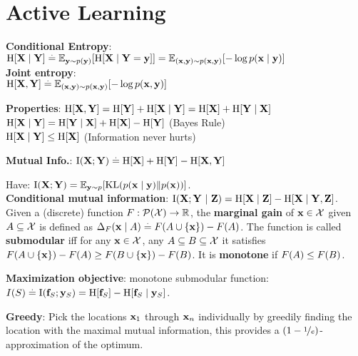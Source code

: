 \section{Active Learning}
\begin{framed}
    \textbf{Conditional Entropy}: \\
    $\H{\rX \mid \rY} \defeq \E[\vy \sim p(\vy)]{\H{\rX \mid \rY = \vy}} \\= \E[(\vx, \vy) \sim p(\vx, \vy)]{- \log p(\vx \mid \vy)}$ \\
    \textbf{Joint entropy}: \\
    $\H{\rX, \rY} \defeq \E[(\vx, \vy) \sim p(\vx, \vy)]{- \log p(\vx, \vy)}$ 
    \vspace{1mm}
\end{framed}
\begin{framed}
    \textbf{Properties}: $\H{\rX, \rY} = \H{\rY} + \H{\rX \mid \rY} = \H{\rX} + \H{\rY \mid \rX}$ \\
    $\H{\rX \mid \rY} = \H{\rY \mid \rX} + \H{\rX} - \H{\rY}$ (Bayes Rule) \\
    $\H{\rX \mid \rY} \leq \H{\rX}$ (Information never hurts)
\end{framed}
\begin{framed}
    \textbf{Mutual Info.}: $\I{\rX}{\rY} \defeq \H{\rX} + \H{\rY} - \H{\rX, \rY}$
\end{framed}
Have: $\I{\rX}{\rY} = \E[\vy \sim p]{\KL{p(\vx \mid \vy)}{p(\vx)}}$. \\
\textbf{Conditional mutual information}: $\I{\rX}{\rY}[\rZ] = \H{\rX \mid \rZ} - \H{\rX \mid \rY, \rZ}$. \\
Given a (discrete) function $F : \pset{\spX} \to \R$, the \textbf{marginal gain} of $\mathbf{x} \in \mathcal{X}$ given $A \subseteq \mathcal{X}$ is defined as $\Delta_F(\mathbf{x} \mid A) \overset{.}{=} F(A \cup \{\mathbf{x}\}) - F(A)$. 
The function is called \textbf{submodular} iff for any $\mathbf{x} \in \mathcal{X}$, any $A \subseteq B \subseteq \mathcal{X}$ it satisfies $F(A \cup \{\mathbf{x}\}) - F(A) \geq F(B \cup \{\mathbf{x}\}) - F(B)$. It is \textbf{monotone} if $F(A) \leq F(B)$. \\
\begin{framed}
    \textbf{Maximization objective}: monotone submodular function: \\ $I(\sS) \defeq \I{\vf_\sS}{\vy_\sS} = \H{\vf_\sS} - \H{\vf_\sS \mid \vy_\sS}$.
\end{framed}
\textbf{Greedy}: Pick the locations $\mathbf{x}_1$ through $\mathbf{x}_n$ individually by greedily finding the location with the maximal mutual information, this provides a $(1 - \nicefrac{1}{e})$-approximation of the optimum. \\
